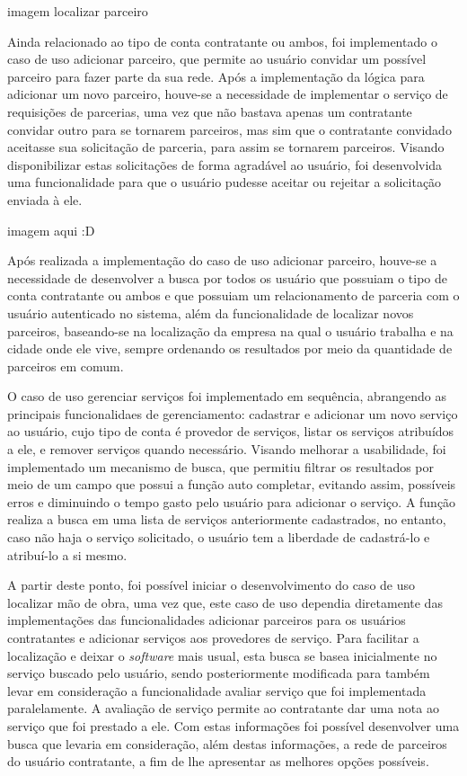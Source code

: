 imagem localizar parceiro



\par Ainda relacionado ao tipo de conta contratante ou ambos, foi implementado o caso de uso adicionar parceiro, que permite ao usuário convidar um possível parceiro para fazer parte da sua rede. Após a implementação da lógica para adicionar um novo parceiro, houve-se a necessidade de implementar o serviço de requisições de parcerias, uma vez que não bastava apenas um contratante convidar outro para se tornarem parceiros, mas sim que o contratante convidado aceitasse sua solicitação de parceria, para assim se tornarem parceiros. Visando disponibilizar estas solicitações de forma agradável ao usuário, foi desenvolvida uma funcionalidade para que o usuário pudesse aceitar ou rejeitar a solicitação enviada à ele.

imagem aqui :D

\par Após realizada a implementação do caso de uso adicionar parceiro, houve-se a necessidade de desenvolver a busca por todos os usuário que possuiam o tipo de conta contratante ou ambos e que possuiam um relacionamento de parceria com o usuário autenticado no sistema, além da funcionalidade de localizar novos parceiros, baseando-se na localização da empresa na qual o usuário trabalha e na cidade onde ele vive, sempre ordenando os resultados por meio da quantidade de parceiros em comum. 

\par O caso de uso gerenciar serviços foi implementado em sequência, abrangendo as principais funcionalidaes de gerenciamento: cadastrar e adicionar um novo serviço ao usuário, cujo tipo de conta é provedor de serviços, listar os serviços atribuídos a ele, e remover serviços quando necessário. Visando melhorar a usabilidade, foi implementado um mecanismo de busca, que permitiu filtrar os resultados por meio de um campo que possui a função  auto completar, evitando assim, possíveis erros e diminuindo o tempo gasto pelo usuário para adicionar o serviço. A função realiza a busca em uma lista de serviços anteriormente cadastrados, no entanto, caso não haja o serviço solicitado, o usuário tem a liberdade de cadastrá-lo e atribuí-lo a si mesmo.

\par A partir deste ponto, foi possível iniciar o desenvolvimento do caso de uso localizar mão de obra, uma vez que, este caso de uso dependia diretamente das implementações das funcionalidades adicionar parceiros para os usuários contratantes e adicionar serviços aos provedores de serviço. Para facilitar a localização e deixar o \textit{software} mais usual, esta busca se basea inicialmente no serviço buscado pelo usuário, sendo posteriormente modificada para também levar em consideração a funcionalidade avaliar serviço que foi implementada paralelamente. A avaliação de serviço permite ao contratante dar uma nota ao serviço que foi prestado a ele. Com estas informações foi possível desenvolver uma busca que levaria em consideração, além destas informações, a rede de parceiros do usuário contratante, a fim de lhe apresentar as melhores opções possíveis.

